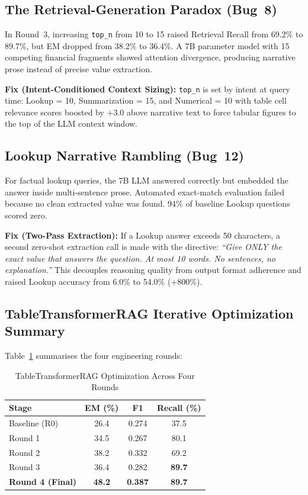 \documentclass[conference]{IEEEtran}
\begin{document}
\subsection{The Retrieval-Generation Paradox (Bug~8)}
In Round~3, increasing \texttt{top\_n} from 10 to 15 raised Retrieval Recall
from 69.2\% to 89.7\%, but EM dropped from 38.2\% to 36.4\%. A 7B
parameter model with 15 competing financial fragments showed attention
divergence, producing narrative prose instead of precise value extraction.

\textbf{Fix (Intent-Conditioned Context Sizing):} \texttt{top\_n} is set by
intent at query time: Lookup = 10, Summarization = 15, and Numerical = 10 with
table cell relevance scores boosted by $+3.0$ above narrative text to force
tabular figures to the top of the LLM context window.

\subsection{Lookup Narrative Rambling (Bug~12)}
For factual lookup queries, the 7B LLM answered correctly but embedded the
answer inside multi-sentence prose. Automated exact-match evaluation failed
because no clean extracted value was found. 94\% of baseline Lookup questions
scored zero.

\textbf{Fix (Two-Pass Extraction):} If a Lookup answer exceeds 50 characters,
a second zero-shot extraction call is made with the directive: \emph{``Give
ONLY the exact value that answers the question. At most 10 words. No sentences,
no explanation.''} This decouples reasoning quality from output format
adherence and raised Lookup accuracy from 6.0\% to 54.0\% ($+800\%$).

\subsection{TableTransformerRAG Iterative Optimization Summary}
Table~\ref{tab:rounds} summarises the four engineering rounds:

\begin{table}[htbp]
\caption{TableTransformerRAG Optimization Across Four Rounds}
\label{tab:rounds}
\centering
\renewcommand{\arraystretch}{1.2}
\begin{tabular}{l c c c}
\toprule
\textbf{Stage} & \textbf{EM (\%)} & \textbf{F1} & \textbf{Recall (\%)} \\
\midrule
Baseline (R0) & 26.4 & 0.274 & 37.5 \\
Round 1       & 34.5 & 0.267 & 80.1 \\
Round 2       & 38.2 & 0.332 & 69.2 \\
Round 3       & 36.4 & 0.282 & \textbf{89.7} \\
\rowcolor{bestrow}
\textbf{Round 4 (Final)} & \textbf{48.2} & \textbf{0.387} & \textbf{89.7} \\
\bottomrule
\end{tabular}
\end{table}
\end{document}
